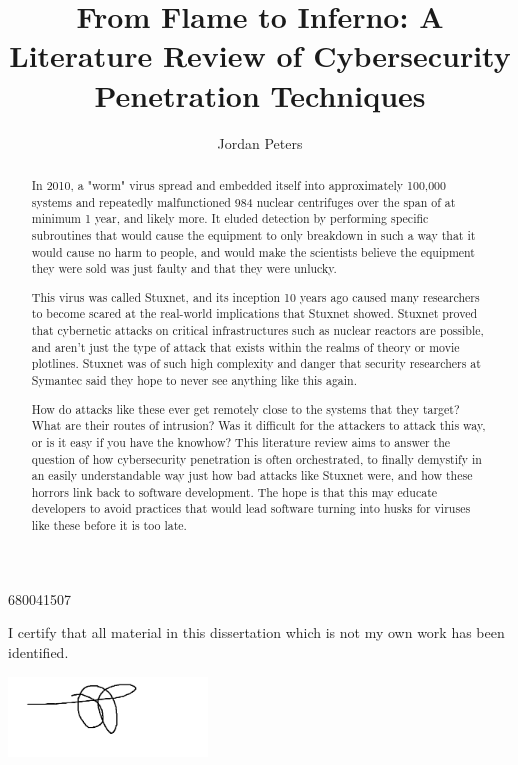 \documentclass[a4paper, 11pt]{article}
\title{From Flame to Inferno: A Literature Review of Cybersecurity Penetration Techniques}
\author{Jordan Peters}
\begin{document}
\begin{titlepage}
    \maketitle

    \begin{center}
    680041507

    I certify that all material in this dissertation which is not my own work has been identified.

    \includegraphics[width=200px]{figs/signature.png}

    \end{center}

    \begin{abstract}
        In 2010, a "worm" virus spread and embedded itself into approximately 100,000 systems and repeatedly malfunctioned 984 nuclear centrifuges over the span of at minimum 1 year, and likely more. It eluded detection by performing specific subroutines that would cause the equipment to only breakdown in such a way that it would cause no harm to people, and would make the scientists believe the equipment they were sold was just faulty and that they were unlucky.

        This virus was called Stuxnet, and its inception 10 years ago caused many researchers to become scared at the real-world implications that Stuxnet showed. Stuxnet proved that cybernetic attacks on critical infrastructures such as nuclear reactors are possible, and aren't just the type of attack that exists within the realms of theory or movie plotlines. Stuxnet was of such high complexity and danger that security researchers at Symantec said they hope to never see anything like this again.

        How do attacks like these ever get remotely close to the systems that they target? What are their routes of intrusion? Was it difficult for the attackers to attack this way, or is it easy if you have the knowhow? This literature review aims to answer the question of how cybersecurity penetration is often orchestrated, to finally demystify in an easily understandable way just how bad attacks like Stuxnet were, and how these horrors link back to software development. The hope is that this may educate developers to avoid practices that would lead software turning into husks for viruses like these before it is too late.
    \end{abstract}
\end{titlepage}
\end{document}
